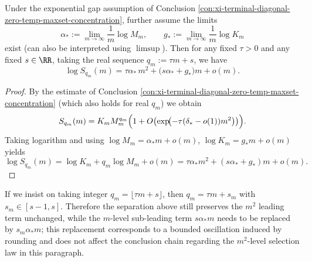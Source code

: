 \begin{conclusion}[Dual-scale diagonal moment expansion: \texorpdfstring{$\log S_q(m)$}{log S_q(m)} admits a completely separable \(m^2+m\) two-tier leading term when \texorpdfstring{$q=\tau m+s$}{q=tau m+s}]\label{con:xi-terminal-diagonal-logSq-m2-m-separation}
Under the exponential gap assumption of Conclusion \ref{con:xi-terminal-diagonal-zero-temp-maxset-concentration}, further assume the limits
\[
\alpha_\ast:=\lim_{m\to\infty}\frac{1}{m}\log M_m,\qquad
g_\ast:=\lim_{m\to\infty}\frac{1}{m}\log K_m
\]
exist (can also be interpreted using \(\limsup\)).
Then for any fixed \(\tau>0\) and any fixed \(s\in\RR\), taking the real sequence \(q_m:=\tau m+s\), we have
\[
\log S_{q_m}(m)=\tau\alpha_\ast\,m^2+\bigl(s\alpha_\ast+g_\ast\bigr)m+o(m).
\]
\end{conclusion}
\begin{proof}
By the estimate of Conclusion \ref{con:xi-terminal-diagonal-zero-temp-maxset-concentration} (which also holds for real \(q_m\)) we obtain
\[
S_{q_m}(m)=K_m M_m^{q_m}\Bigl(1+O\bigl(\exp\!\bigl(-\tau(\delta_\ast-o(1))m^2\bigr)\bigr)\Bigr).
\]
Taking logarithm and using \(\log M_m=\alpha_\ast m+o(m)\), \(\log K_m=g_\ast m+o(m)\) yields
\[
\log S_{q_m}(m)=\log K_m+q_m\log M_m+o(m)
=\tau\alpha_\ast m^2+(s\alpha_\ast+g_\ast)m+o(m).
\]
\end{proof}

\begin{remark}[On the sub-leading term for integer rounding \texorpdfstring{$q_m=\lfloor\tau m+s\rfloor$}{q=floor(tau m+s)}]
If we insist on taking integer \(q_m=\lfloor\tau m+s\rfloor\), then \(q_m=\tau m+s_m\) with \(s_m\in[s-1,s]\).
Therefore the separation above still preserves the \(m^2\) leading term unchanged, while the \(m\)-level sub-leading term \(s\alpha_\ast m\) needs to be replaced by \(s_m\alpha_\ast m\);
this replacement corresponds to a bounded oscillation induced by rounding and does not affect the conclusion chain regarding the \(m^2\)-level selection law in this paragraph.
\end{remark}

